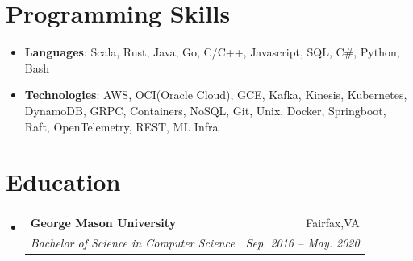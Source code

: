 \documentclass[letterpaper,11pt]{article}
\makeatletter
\newcommand{\resumeSubheading}[4]{
  \vspace{-1pt}\item
    \begin{tabular*}{0.97\textwidth}[t]{l@{\extracolsep{\fill}}r}
      \textbf{#1} & #2 \\
      \textit{\small#3} & \textit{\small #4} \\
    \end{tabular*}\vspace{-5pt}
}
\newcommand{\resumeSubHeadingListStart}{\begin{itemize}[leftmargin=*]}
\newcommand{\resumeSubHeadingListEnd}{\end{itemize}}
\makeatother
\begin{document}
\section{Programming Skills}
 \resumeSubHeadingListStart
   \item{
     \textbf{Languages}{: Scala, Rust, Java, Go, C/C++, Javascript, SQL, C\#, Python, Bash }
   }
   \item{
    \textbf{Technologies}{: AWS, OCI(Oracle Cloud), GCE, Kafka, Kinesis, Kubernetes, DynamoDB, GRPC,
     Containers, NoSQL, Git, Unix, Docker, Springboot, Raft, OpenTelemetry, REST, ML Infra}
   }
 \resumeSubHeadingListEnd

\section{Education}
  \resumeSubHeadingListStart
    \resumeSubheading
      {George Mason University}{Fairfax,VA}
      {Bachelor of Science in Computer Science}{Sep. 2016 -- May. 2020}
  \resumeSubHeadingListEnd
\end{document}
